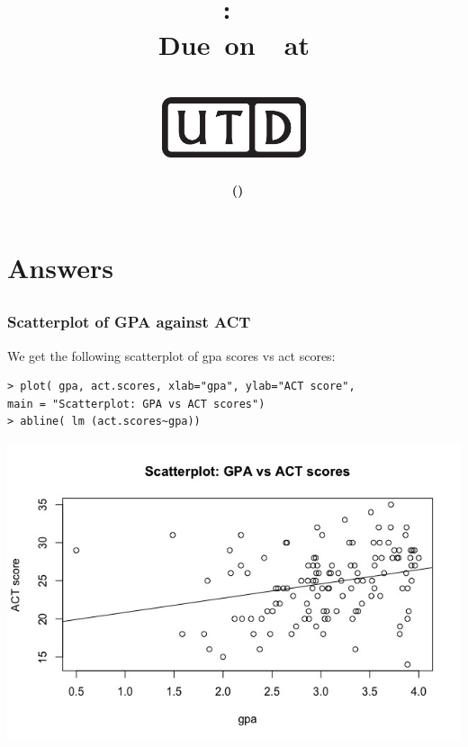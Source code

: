\documentclass[12pt,letterpaper,titlepage,en-US]{article}
\title{
    \vspace{1in}
    \textmd{\textbf{\hmwkClassName \\\hmwkClass:\ \hmwkTitle }}\\
     \normalsize\vspace{0.1in}\small{Due\ on\ \DTMusedate{DueDate}\ at \DTMusetime{DueDate} }\\
    \vspace{0.1in}\large{\textit{\hmwkClassInstructor}}\\
    \vspace{0.5in}\includegraphics[height=2.4em]{UTD_logo_BW}\\
    \vspace{2in}
}
\author{\textbf{\hmwkAuthorName\ \footnotesize{(\hmwkAuthorNetID)}} \\ }
\date{}
\begin{document}
\maketitle


\tableofcontents

\pagebreak
{}


\section{Answers}

\subsection{}

\subsubsection{Scatterplot of GPA against ACT}
We get the following scatterplot of gpa scores vs act scores:
\begin{knitrout}
\color{fgcolor}
\begin{kframe}
\begin{verbatim}
> plot( gpa, act.scores, xlab="gpa", ylab="ACT score",
main = "Scatterplot: GPA vs ACT scores")
> abline( lm (act.scores~gpa))
\end{verbatim}
\end{kframe}
\end{knitrout}
\includegraphics[scale=0.6]{scatterplot.jpeg}\\
\end{document}
